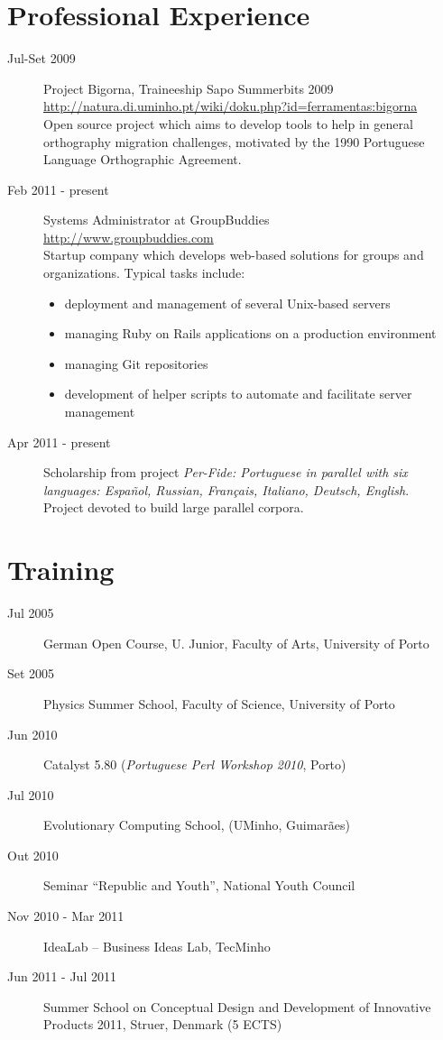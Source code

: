 \documentclass{article}
\begin{document}
\section{Professional Experience}
\begin{description}
\item [Jul-Set 2009] Project Bigorna, Traineeship Sapo Summerbits 2009\\
\url{http://natura.di.uminho.pt/wiki/doku.php?id=ferramentas:bigorna}\\
Open source project which aims to develop tools to help in general orthography migration challenges, motivated by the 1990 Portuguese Language Orthographic Agreement.
\item [Feb 2011 - present] Systems Administrator at GroupBuddies\\
\url{http://www.groupbuddies.com}\\
Startup company which develops web-based solutions for groups and organizations. Typical tasks include:
\begin{itemize}
	\item deployment and management of several Unix-based servers
	\item managing Ruby on Rails applications on a production environment
	\item managing Git repositories
	\item development of helper scripts to automate and facilitate server management
	\end{itemize}
\item [Apr 2011 - present] Scholarship from project \textit{Per-Fide: Portuguese in parallel with six languages: Español, Russian, Français, Italiano, Deutsch, English}.\\
Project devoted to build large parallel corpora.

\end{description}


\section {Training}
\begin {description}
\item [Jul 2005] German Open Course, U. Junior, Faculty of Arts, University of Porto
\item [Set 2005] Physics Summer School, Faculty of Science, University of Porto
\item [Jun 2010] Catalyst 5.80 (\textit{Portuguese Perl Workshop 2010}, Porto)
\item [Jul 2010] Evolutionary Computing School, (UMinho, Guimarães)
\item [Out 2010] Seminar ``Republic and Youth'', National Youth Council
\item [Nov 2010 - Mar 2011] IdeaLab -- Business Ideas Lab, TecMinho
\item [Jun 2011 - Jul 2011] Summer School on Conceptual Design and Development of Innovative Products 2011, Struer, Denmark (5 ECTS)
\end{description}
\end{document}
